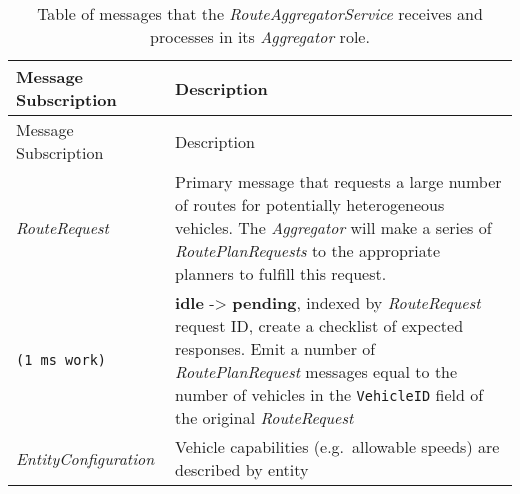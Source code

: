 \begin{longtable}[c]{@{}ll@{}}
\caption{Table of messages that the \emph{RouteAggregatorService}
receives and processes in its \emph{Aggregator} role.}\tabularnewline
\toprule
\begin{minipage}[b]{0.29\columnwidth}\raggedright\strut
Message Subscription
\strut\end{minipage} &
\begin{minipage}[b]{0.65\columnwidth}\raggedright\strut
Description
\strut\end{minipage}\tabularnewline
\midrule
\endfirsthead
\toprule
\begin{minipage}[b]{0.29\columnwidth}\raggedright\strut
Message Subscription
\strut\end{minipage} &
\begin{minipage}[b]{0.65\columnwidth}\raggedright\strut
Description
\strut\end{minipage}\tabularnewline
\midrule
\endhead
\begin{minipage}[t]{0.29\columnwidth}\raggedright\strut
\emph{RouteRequest}
\strut\end{minipage} &
\begin{minipage}[t]{0.65\columnwidth}\raggedright\strut
Primary message that requests a large number of routes for potentially
heterogeneous vehicles. The \emph{Aggregator} will make a series of
\emph{RoutePlanRequests} to the appropriate planners to fulfill this
request.
\strut\end{minipage}\tabularnewline
\begin{minipage}[t]{0.29\columnwidth}\raggedright\strut
\begin{verbatim}
(1 ms work)
\end{verbatim}
\strut\end{minipage} &
\begin{minipage}[t]{0.65\columnwidth}\raggedright\strut
\textbf{idle} -\textgreater{} \textbf{pending}, indexed by
\emph{RouteRequest} request ID, create a checklist of expected
responses. Emit a number of \emph{RoutePlanRequest} messages equal to
the number of vehicles in the \texttt{VehicleID} field of the original
\emph{RouteRequest}
\strut\end{minipage}\tabularnewline
\begin{minipage}[t]{0.29\columnwidth}\raggedright\strut
\emph{EntityConfiguration}
\strut\end{minipage} &
\begin{minipage}[t]{0.65\columnwidth}\raggedright\strut
Vehicle capabilities (e.g.~allowable speeds) are described by entity

\end{minipage}
\end{longtable}
